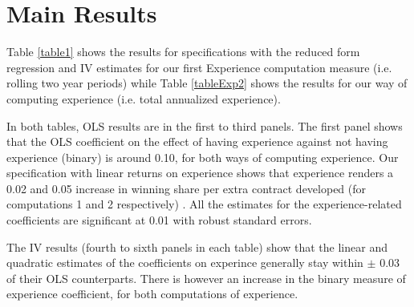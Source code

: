 \section{Main Results}


Table \ref{table1} shows the results for specifications with the reduced form regression and IV estimates for our first Experience computation measure (i.e. rolling two year periods) while Table \ref{tableExp2} shows the results for our way of computing experience (i.e. total annualized experience).

In both tables, OLS results are in the first to third panels. The first panel shows that the OLS coefficient on the effect of having experience against not having experience (binary) is around 0.10, for both ways of computing experience. Our specification with linear returns on experience shows that experience renders a 0.02 and 0.05 increase in winning share per extra contract developed (for computations 1 and 2 respectively) . All the estimates for the experience-related coefficients are significant at 0.01 with robust standard errors.

The IV results (fourth to sixth panels in each table) show that  the linear and quadratic estimates of the coefficients on experince generally stay within $\pm$ 0.03 of their OLS counterparts. There is however an increase in the binary measure of experience coefficient, for both computations of experience.

